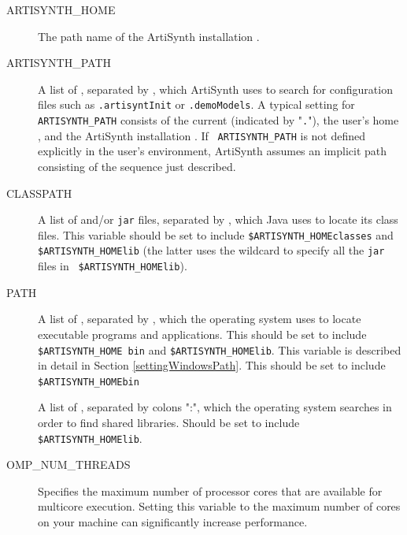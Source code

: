 \begin{description}

\item[ARTISYNTH\_HOME]\mbox{}
 
The path name of the ArtiSynth installation \directory.

\item[ARTISYNTH\_PATH]\mbox{}

A list of \directories, separated by \separatorDesc, which ArtiSynth
uses to search for configuration files such as {\tt .artisyntInit} or
{\tt .demoModels}.  A typical setting for {\tt ARTISYNTH\_PATH}
consists of the current \directory (indicated by "{\tt .}"), the user's
home \directory, and the ArtiSynth installation \directory. If {\tt
ARTISYNTH\_PATH} is not defined explicitly in the user's environment,
ArtiSynth assumes an implicit path consisting of the \directory
sequence just described.

\item[CLASSPATH]\mbox{}

A list of \directories and/or {\tt jar} files, separated by
\separatorDesc, which Java uses to locate its class files. This
variable should be set to include {\tt \$ARTISYNTH\_HOME\SEP classes}
and {\tt \$ARTISYNTH\_HOME\SEP lib\SEP *} (the latter uses the
wildcard {\tt *} to specify all the {\tt jar} files in {\tt
\$ARTISYNTH\_HOME\SEP lib}).

\item[PATH]\mbox{}
 
A list of \directories, separated by \separatorDesc, which the
operating system uses to locate executable programs and
applications. 
\ifWindows
This should be set to include {\tt \$ARTISYNTH\_HOME\SEP
bin} and {\tt \$ARTISYNTH\_HOME\SEP lib\SEP \ARCH}.
This variable is described in detail in Section \ref{settingWindowsPath}.
\else
This should be set to include {\tt \$ARTISYNTH\_HOME\SEP bin}
\fi

\ifNeedLibraryPath
\ifWindows\else
\item[\LIBRARYPATH]\mbox{}

A list of \directories, separated by colons
":", which the operating system searches in order to find shared libraries.
Should be set to include {\tt \$ARTISYNTH\_HOME\SEP lib\SEP \ARCH}.
\fi
\fi

\item[OMP\_NUM\_THREADS]\mbox{}
 
Specifies the maximum number of processor cores that are available for
multicore execution. Setting this variable to the maximum number of
cores on your machine can significantly increase performance.

\end{description}

